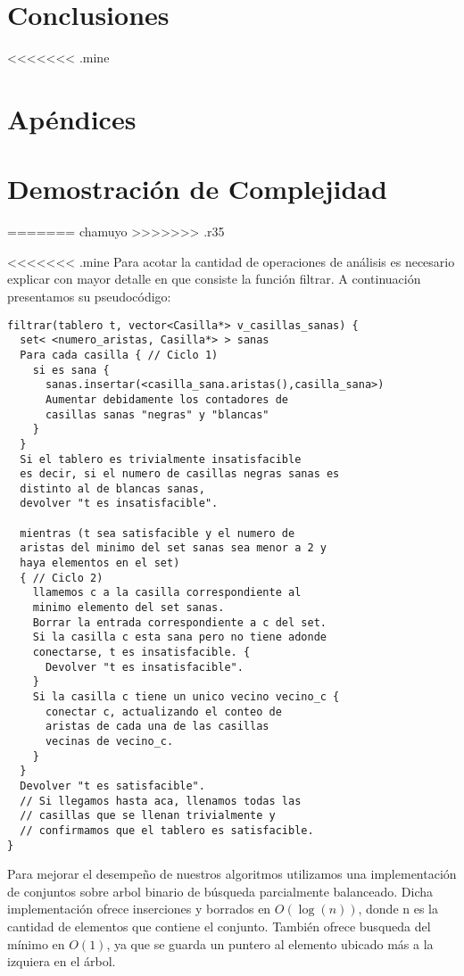 \documentclass[a4paper, 12pt] {article}
\begin{document}
\section*{Conclusiones}
<<<<<<< .mine
\section*{Ap\'endices} 
\section{Demostraci\'on de Complejidad}\label{demo:comp_3}
=======
chamuyo
>>>>>>> .r35

<<<<<<< .mine
Para acotar la cantidad de operaciones de an\'alisis es necesario explicar con mayor detalle en que consiste la funci\'on filtrar.
A continuaci\'on presentamos su pseudoc\'odigo:

\begin{verbatim}
filtrar(tablero t, vector<Casilla*> v_casillas_sanas) {
  set< <numero_aristas, Casilla*> > sanas
  Para cada casilla { // Ciclo 1)
    si es sana {
      sanas.insertar(<casilla_sana.aristas(),casilla_sana>)
      Aumentar debidamente los contadores de 
      casillas sanas "negras" y "blancas"
    }
  }
  Si el tablero es trivialmente insatisfacible 
  es decir, si el numero de casillas negras sanas es 
  distinto al de blancas sanas,
  devolver "t es insatisfacible".
  
  mientras (t sea satisfacible y el numero de 
  aristas del minimo del set sanas sea menor a 2 y
  haya elementos en el set)
  { // Ciclo 2)
    llamemos c a la casilla correspondiente al
    minimo elemento del set sanas.
    Borrar la entrada correspondiente a c del set.
    Si la casilla c esta sana pero no tiene adonde 
    conectarse, t es insatisfacible. {
      Devolver "t es insatisfacible".
    }
    Si la casilla c tiene un unico vecino vecino_c {
      conectar c, actualizando el conteo de
      aristas de cada una de las casillas 
      vecinas de vecino_c.
    }
  }
  Devolver "t es satisfacible".
  // Si llegamos hasta aca, llenamos todas las
  // casillas que se llenan trivialmente y 
  // confirmamos que el tablero es satisfacible.
}

\end{verbatim}


Para mejorar el desempe\~no de nuestros algoritmos utilizamos una implementaci\'on de conjuntos sobre arbol binario de b\'usqueda parcialmente balanceado. Dicha implementaci\'on ofrece inserciones y borrados en $O\left( \log\left( n\right) \right) $, donde n es la cantidad de elementos que contiene el conjunto. Tambi\'en ofrece busqueda del m\'inimo en $O\left( 1\right) $, ya que se guarda un puntero al elemento ubicado m\'as a la izquiera en el \'arbol.
\end{document}
